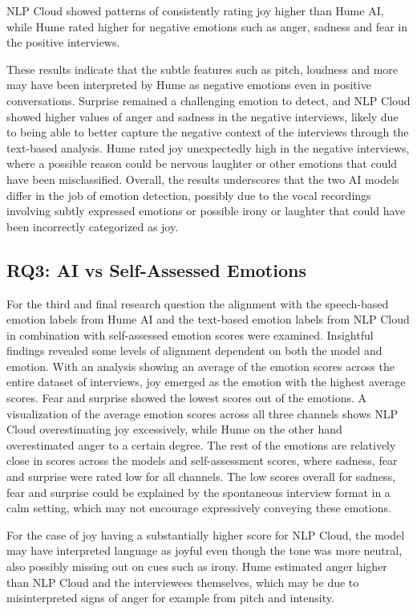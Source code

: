 NLP Cloud showed patterns of consistently rating joy higher than Hume AI, while Hume rated higher for negative emotions such as anger, sadness and fear in the positive interviews.

These results indicate that the subtle features such as pitch, loudness and more may have been interpreted by Hume as negative emotions even in positive conversations.
Surprise remained a challenging emotion to detect, and NLP Cloud showed higher values of anger and sadness in the negative interviews, likely due to being able to better capture the negative context of the interviews through the text-based analysis.
Hume rated joy unexpectedly high in the negative interviews, where a possible reason could be nervous laughter or other emotions that could have been misclassified.
Overall, the results underscores that the two AI models differ in the job of emotion detection, possibly due to the vocal recordings involving subtly expressed emotions or possible irony or laughter that could have been incorrectly categorized as joy. 

\subsection{RQ3: AI vs Self-Assessed Emotions}
For the third and final research question the alignment with the speech-based emotion labels from Hume AI and the text-based emotion labels from NLP Cloud in combination with self-assessed emotion scores were examined. Insightful findings revealed some levels of alignment dependent on both the model and emotion.
With an analysis showing an average of the emotion scores across the entire dataset of interviews, joy emerged as the emotion with the highest average scores. Fear and surprise showed the lowest scores out of the emotions. A visualization of the average emotion scores across all three channels shows NLP Cloud overestimating joy excessively, while Hume on the other hand overestimated anger to a certain degree.
The rest of the emotions are relatively close in scores across the models and self-assessment scores, where sadness, fear and surprise were rated low for all channels.
The low scores overall for sadness, fear and surprise could be explained by the spontaneous interview format in a calm setting, which may not encourage expressively conveying these emotions.

For the case of joy having a substantially higher score for NLP Cloud, the model may have interpreted language as joyful even though the tone was more neutral, also possibly missing out on cues such as irony.
Hume estimated anger higher than NLP Cloud and the interviewees themselves, which may be due to misinterpreted signs of anger for example from pitch and intensity.

